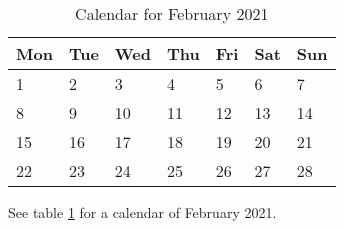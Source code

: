 \documentclass{article}
\begin{document}
\begin{table}
	\begin{center}
	\begin{tabular}{p{1.5cm}  p{1.5cm}  p{1.5cm}  p{1.5cm}  p{1.5cm}  p{1.5cm}  p{1.5cm}}
		\textbf{Mon} & \textbf{Tue} & \textbf{Wed} & \textbf{Thu} & \textbf{Fri} & \textbf{Sat} & \textbf{Sun} \\ \hline
		1 & 2 & 3 & 4 & 5 & 6 & 7 \\
		8 & 9 & 10 & 11 & 12 & 13 & 14 \\ 
		15 & 16 & 17 & 18 & 19 & 20 & 21 \\
		22 & 23 & 24 & 25 & 26 & 27 & 28 \\
	\end{tabular}
\caption{\label{tab:calendar-feb-2021}Calendar for February 2021}
\end{center}
\end{table}
See table \ref{tab:calendar-feb-2021} for a calendar of February 2021.
\end{document}
